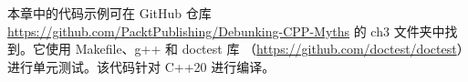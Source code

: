 本章中的代码示例可在 GitHub 仓库 \url{https://github.com/PacktPublishing/Debunking-CPP-Myths} 的 ch3 文件夹中找到。它使用 Makefile、g++ 和 doctest 库 （\url{https://github.com/doctest/doctest}）进行单元测试。该代码针对 C++20 进行编译。

